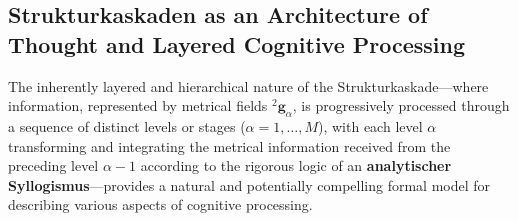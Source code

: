 \documentclass[
    12pt,              %
    a4paper,           %
    headings=normal,   %
    twoside=true,      %
    BCOR=8mm,          %
]{scrbook}
\newcommand{\kompositionsfeld}{{}^2\mathbf{g}}
\newcommand{\kaskadenstufe}{\alpha}
\begin{document}
\subsection{Strukturkaskaden as an Architecture of Thought and Layered Cognitive Processing}
\label{sec:ch9_4_1_architecture_thought_cognition}
The inherently layered and hierarchical nature of the Strukturkaskade—where information, represented by metrical fields \(\kompositionsfeld_\alpha\), is progressively processed through a sequence of distinct levels or stages (\(\kaskadenstufe = 1, \ldots, M\)), with each level \(\kaskadenstufe\) transforming and integrating the metrical information received from the preceding level \(\kaskadenstufe-1\) according to the rigorous logic of an \textbf{analytischer Syllogismus}—provides a natural and potentially compelling formal model for describing various aspects of cognitive processing.
\end{document}

